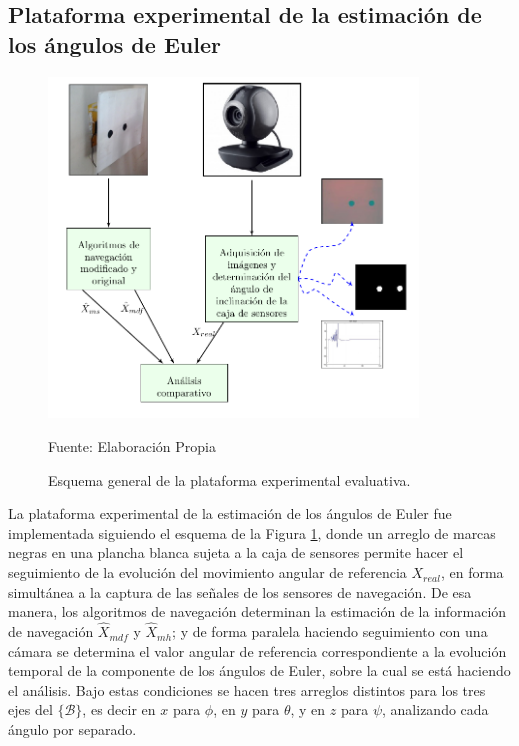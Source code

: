 \documentclass[conference]{IEEEtran}
\newcommand{\marco}[1]{\{\mathcal{#1}\}}
\begin{document}
\subsection{Plataforma experimental de la estimación de los ángulos de Euler}\label{Plataforma2}
\begin{figure}
\centering
\includegraphics[width=26.5em]{plataforma_fig13.pdf}
\caption{Esquema general de la plataforma experimental evaluativa.}
\scriptsize{Fuente: Elaboración Propia}
\label{plataforma_fig10}
\end{figure}
La plataforma experimental de la estimación de los ángulos de Euler fue implementada siguiendo el esquema de la Figura \ref{plataforma_fig10}, donde un arreglo de marcas negras en una plancha blanca sujeta a la caja de sensores permite hacer el seguimiento de la evolución del movimiento angular de referencia $X_{real}$, en forma simultánea a la captura de las señales de los sensores de navegación. De esa manera, los algoritmos de navegación determinan la estimación de la información de navegación $\hat{X}_{mdf}$ y $\hat{X}_{mh}$; y de forma paralela haciendo seguimiento con una cámara se determina el valor angular de referencia correspondiente a la evolución temporal de la componente de los ángulos de Euler, sobre la cual se está haciendo el análisis. Bajo estas condiciones se hacen tres arreglos distintos para los tres ejes del $\marco{B}$, es decir en $x$ para $\phi$, en $y$ para $\theta$, y en $z$ para $\psi$, analizando cada ángulo por separado.
\end{document}
